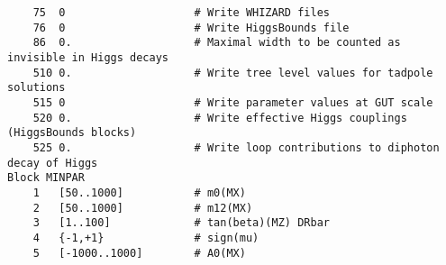 \documentclass[final,3p,11pt,pdflatex]{elsarticle}
\begin{document}
\begin{lstlisting}
    75  0                    # Write WHIZARD files
    76  0                    # Write HiggsBounds file
    86  0.                   # Maximal width to be counted as invisible in Higgs decays
    510 0.                   # Write tree level values for tadpole solutions
    515 0                    # Write parameter values at GUT scale
    520 0.                   # Write effective Higgs couplings (HiggsBounds blocks)
    525 0.                   # Write loop contributions to diphoton decay of Higgs
Block MINPAR
    1   [50..1000]           # m0(MX)
    2   [50..1000]           # m12(MX)
    3   [1..100]             # tan(beta)(MZ) DRbar
    4   {-1,+1}              # sign(mu)
    5   [-1000..1000]        # A0(MX)
\end{lstlisting}

\clearpage
\end{document}
